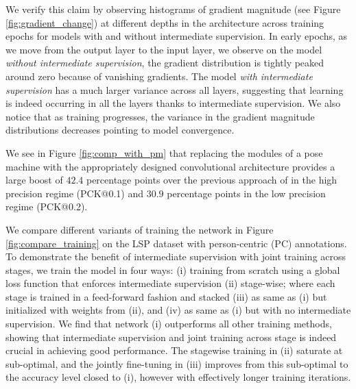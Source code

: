 \documentclass[10pt,twocolumn,letterpaper]{article}
\begin{document}
We verify this claim by observing histograms of gradient magnitude (see Figure \ref{fig:gradient_change}) at different depths in the architecture across training epochs for models with and without intermediate supervision. In early epochs, as we move from the output layer to the input layer, we observe on the model \emph{without intermediate supervision}, the gradient distribution is tightly peaked around zero because of vanishing gradients. The model \emph{with intermediate supervision} has a much larger variance across all  layers, suggesting that learning is indeed occurring in all the layers thanks to intermediate supervision. We also notice that as training progresses, the variance in the gradient magnitude distributions decreases pointing to model convergence.

We see in Figure \ref{fig:comp_with_pm} that replacing the modules of a pose machine with the appropriately designed convolutional architecture provides a large boost of $42.4$ percentage points over the previous approach of \cite{Ramakrishna2014posemachines} in the high precision regime (PCK@0.1) and  $30.9$ percentage points in the low precision regime (PCK@0.2).

\label{sec:compare_learning} We compare different variants of training the network in Figure \ref{fig:compare_training} on the LSP dataset with person-centric (PC) annotations. To demonstrate the benefit of intermediate supervision with joint training across stages, we train the model in four ways:
(i) training from scratch using a global loss function that enforces intermediate supervision
(ii) stage-wise; where each stage is trained in a feed-forward fashion and stacked
(iii) as same as (i) but initialized with weights from (ii), and
(iv) as same as (i) but with no intermediate supervision. We find that network (i) outperforms all other training methods, showing that intermediate supervision and joint training across stage is indeed crucial in achieving good performance. The stagewise training in (ii) saturate at sub-optimal, and the jointly fine-tuning in (iii) improves from this sub-optimal to the accuracy level closed to (i), however with effectively longer training iterations.
\end{document}

